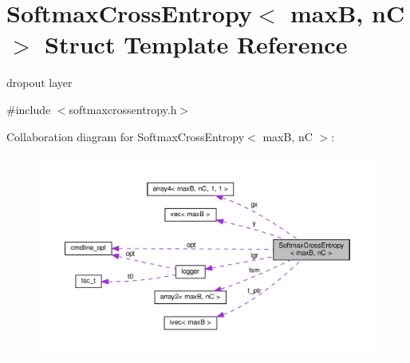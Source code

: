 \hypertarget{structSoftmaxCrossEntropy}{}\section{Softmax\+Cross\+Entropy$<$ maxB, nC $>$ Struct Template Reference}
\label{structSoftmaxCrossEntropy}


dropout layer  




{\ttfamily \#include $<$softmaxcrossentropy.\+h$>$}



Collaboration diagram for Softmax\+Cross\+Entropy$<$ maxB, nC $>$\+:
\nopagebreak
\begin{figure}[H]
\begin{center}
\leavevmode
\includegraphics[width=350pt]{structSoftmaxCrossEntropy__coll__graph}
\end{center}
\end{figure}

